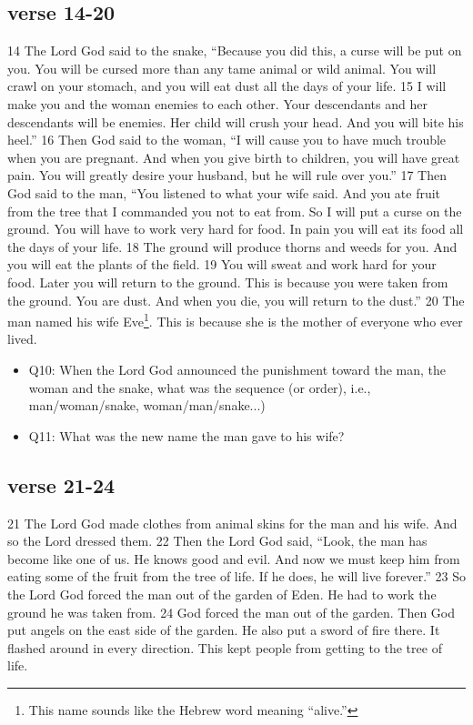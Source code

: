 \subsection{verse 14-20}
\large{
14 The Lord God said to the snake, “Because you did this, a curse will be put on you. You will be cursed more than any tame animal or wild animal. You will crawl on your stomach, and you will eat dust all the days of your life. 15 I will make you and the woman enemies to each other. Your descendants and her descendants will be enemies. Her child will crush your head. And you will bite his heel.”
16 Then God said to the woman, “I will cause you to have much trouble when you are pregnant. And when you give birth to children, you will have great pain. You will greatly desire your husband, but he will rule over you.”
17 Then God said to the man, “You listened to what your wife said. And you ate fruit from the tree that I commanded you not to eat from. So I will put a curse on the ground. You will have to work very hard for food. In pain you will eat its food all the days of your life. 18 The ground will produce thorns and weeds for you. And you will eat the plants of the field. 19 You will sweat and work hard for your food. Later you will return to the ground. This is because you were taken from the ground. You are dust. And when you die, you will return to the dust.” 20 The man named his wife Eve\footnote{This name sounds like the Hebrew word meaning “alive.”}.  This is because she is the mother of everyone who ever lived.}

\begin{itemize}
\item Q10: When the Lord God announced the punishment toward the man, the woman and the snake, what was the sequence (or order), i.e., man/woman/snake, woman/man/snake...)
\item Q11: What was the new name the man gave to his wife?
\end{itemize}

\subsection{verse 21-24}
\large{21 The Lord God made clothes from animal skins for the man and his wife. And so the Lord dressed them. 22 Then the Lord God said, “Look, the man has become like one of us. He knows good and evil. And now we must keep him from eating some of the fruit from the tree of life. If he does, he will live forever.” 23 So the Lord God forced the man out of the garden of Eden. He had to work the ground he was taken from. 24 God forced the man out of the garden. Then God put angels on the east side of the garden. He also put a sword of fire there. It flashed around in every direction. This kept people from getting to the tree of life.}

